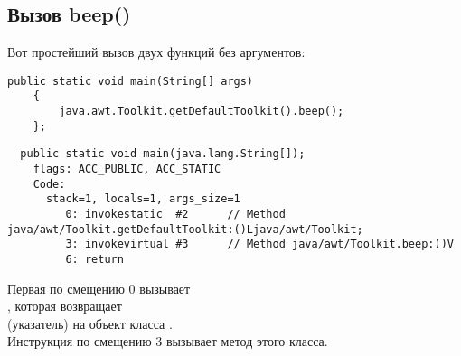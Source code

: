 \subsection{Вызов beep()}

Вот простейший вызов двух функций без аргументов:

\begin{lstlisting}[style=customjava]
	public static void main(String[] args)
	{
		java.awt.Toolkit.getDefaultToolkit().beep();
	};
\end{lstlisting}

\begin{lstlisting}
  public static void main(java.lang.String[]);
    flags: ACC_PUBLIC, ACC_STATIC
    Code:
      stack=1, locals=1, args_size=1
         0: invokestatic  #2      // Method java/awt/Toolkit.getDefaultToolkit:()Ljava/awt/Toolkit;
         3: invokevirtual #3      // Method java/awt/Toolkit.beep:()V
         6: return        
\end{lstlisting}

Первая  по смещению 0 вызывает\\
, 
которая возвращает\\
 (указатель) на объект класса .\\

Инструкция  по смещению 3 вызывает метод  этого класса.

